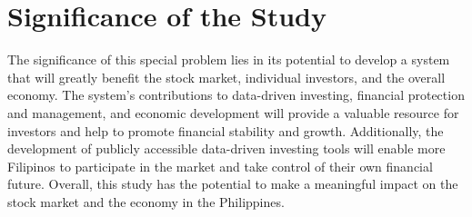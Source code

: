 \section{Significance of the Study}
\label{sec:significance}
The significance of this special problem lies in its potential to develop a 
system that will greatly benefit the stock market, individual investors, and 
the overall economy. The system's contributions to data-driven investing, 
financial protection and management, and economic development will provide 
a valuable resource for investors and help to promote financial stability and growth. 
Additionally, the development of publicly accessible data-driven investing tools 
will enable more Filipinos to participate in the market and take control of their 
own financial future. Overall, this study has the potential to make a meaningful 
impact on the stock market and the economy in the Philippines.
\hfill \\

